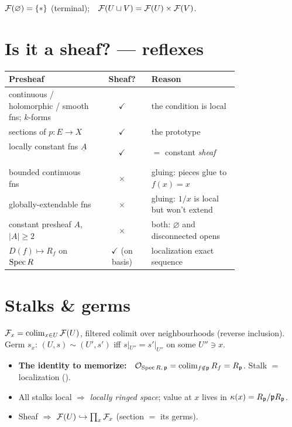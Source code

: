 \begin{warnbox}
$\mathcal{F}(\varnothing)=\{*\}$ (terminal);\ \ $\mathcal{F}(U\sqcup V)=\mathcal{F}(U)\times\mathcal{F}(V)$.
\end{warnbox}

\section{Is it a sheaf? --- reflexes}

\begin{center}
\begin{tabular}{@{}L{0.40\linewidth} c L{0.38\linewidth}@{}}
\toprule
\textbf{Presheaf} & \textbf{Sheaf?} & \textbf{Reason} \\
\midrule
continuous / holomorphic / smooth fns; $k$-forms & \textcolor{good}{$\checkmark$} & the condition is local \\
\addlinespace
sections of $p\colon E\to X$ & \textcolor{good}{$\checkmark$} & the prototype \\
\addlinespace
locally constant fns $\underline A$ \  & \textcolor{good}{$\checkmark$} & $=$ constant \emph{sheaf} \\
\addlinespace
bounded continuous fns & \textcolor{bad}{$\times$} & gluing: pieces glue to $f(x)=x$ \\
\addlinespace
globally-extendable fns & \textcolor{bad}{$\times$} & gluing: $1/x$ is local but won't extend \\
\addlinespace
constant presheaf $A$, $|A|\ge2$ & \textcolor{bad}{$\times$} & both: $\varnothing$ and disconnected opens \\
\addlinespace
$D(f)\mapsto R_f$ on $\operatorname{Spec} R$ & \textcolor{good}{$\checkmark$} (on basis) & localization exact sequence \\
\bottomrule
\end{tabular}
\end{center}

\section{Stalks \& germs \ }

\begin{defbox}
$\mathcal{F}_x=\operatorname*{colim}_{x\in U}\mathcal{F}(U)$, filtered colimit over neighbourhoods (reverse
inclusion). Germ $s_x$: $(U,s)\sim(U',s')$ iff $s|_{U''}=s'|_{U''}$ on some
$U''\ni x$.
\end{defbox}

\begin{itemize}[leftmargin=1.4em]
\item \textbf{The identity to memorize:}\ \
$\mathcal{O}_{\operatorname{Spec} R,\,\mathfrak{p}}=\operatorname*{colim}_{f\notin\mathfrak{p}}R_f=R_{\mathfrak{p}}$. Stalk $=$ localization
(\Tag{01HV}).
\item All stalks local $\Rightarrow$ \emph{locally ringed space}; value at $x$
lives in $\kappa(x)=R_{\mathfrak{p}}/\mathfrak{p} R_{\mathfrak{p}}$.
\item Sheaf $\Rightarrow$ $\mathcal{F}(U)\hookrightarrow\prod_{x}\mathcal{F}_x$ (section $=$ its
germs).
\end{itemize}

